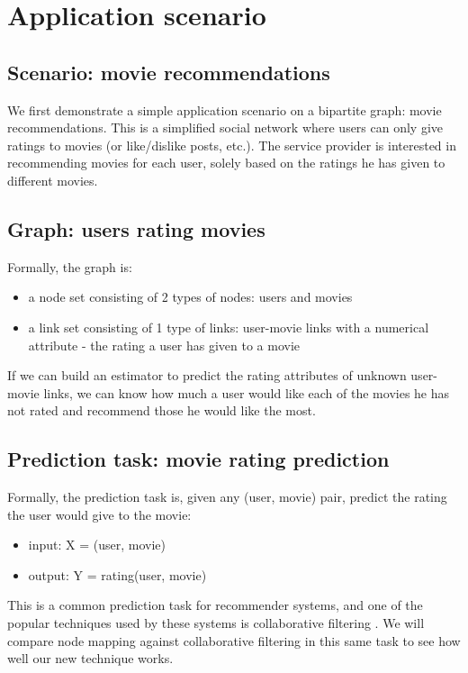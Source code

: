 \documentclass{article}
\begin{document}
\section{Application scenario}

\subsection{Scenario: movie recommendations}
We first demonstrate a simple application scenario on a bipartite graph: 
movie recommendations.
This is a simplified social network where users can only give ratings to movies 
(or like/dislike posts, etc.).
The service provider is interested in recommending movies for each user, solely 
based on the ratings he has given to different movies.

\subsection{Graph: users rating movies}
Formally, the graph is:
\begin{itemize}
	\item a node set consisting of 2 types of nodes: users and movies
	\item a link set consisting of 1 type of links: user-movie links with 
	a numerical attribute - the rating a user has given to a movie
\end{itemize}
If we can build an estimator to predict the rating attributes of unknown 
user-movie links, 
we can know how much a user would like each of the movies he has not 
rated and recommend those he would like the most.

\subsection{Prediction task: movie rating prediction}
Formally, the prediction task is, given any (user, movie) pair, predict the 
rating the user would give to the movie:
\begin{itemize}
	\item input: X = (user, movie)
	\item output: Y = rating(user, movie)
\end{itemize}
This is a common prediction task for recommender systems,
and one of the popular techniques used by these systems is collaborative 
filtering \cite{polatidis2016multi}.
We will compare node mapping against collaborative filtering in this same 
task to see how well our new technique works.
\end{document}

